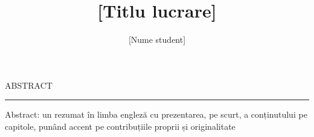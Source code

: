 \documentclass[12pt]{report}
\begin{document}
\specialization{[Secție]}	
\title{[Titlu lucrare]}					   
\author{[Nume student]}											
				
\maketitle


\newpage
\thispagestyle{empty}
\mbox{}
\newpage
{} 

\cleardoublepage
ABSTRACT
\vspace{0.5cm}	
\hrule
\vspace{0.5cm}	

Abstract: un rezumat în limba engleză cu prezentarea, pe scurt, a conținutului pe capitole, punând accent pe contribuțiile proprii și originalitate



\tableofcontents


\newpage
{}










\end{document}

